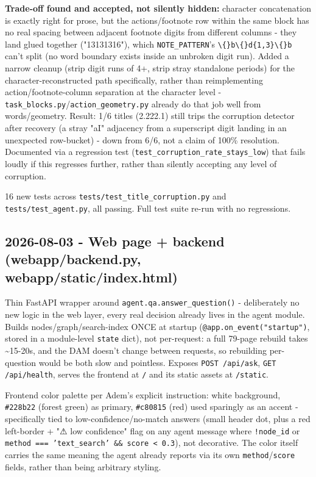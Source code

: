 \textbf{Trade-off found and accepted, not silently hidden:} character concatenation is exactly right for prose, but the actions/footnote row within the same block has no real spacing between adjacent footnote digits from different columns - they land glued together ("13131316"), which \texttt{NOTE\_\allowbreak{}PATTERN}'s \texttt{\textbackslash\{\}b\textbackslash\{\}d\{1,3\}\textbackslash\{\}b} can't split (no word boundary exists inside an unbroken digit run). Added a narrow cleanup (strip digit runs of 4+, strip stray standalone periods) for the character-reconstructed path specifically, rather than reimplementing action/footnote-column separation at the character level - \texttt{task\_\allowbreak{}blocks.py}/\texttt{action\_\allowbreak{}geometry.py} already do that job well from words/geometry. Result: 1/6 titles (2.222.1) still trips the corruption detector after recovery (a stray "aI" adjacency from a superscript digit landing in an unexpected row-bucket) - down from 6/6, not a claim of 100\% resolution. Documented via a regression test (\texttt{test\_\allowbreak{}corruption\_\allowbreak{}rate\_\allowbreak{}stays\_\allowbreak{}low}) that fails loudly if this regresses further, rather than silently accepting any level of corruption.

16 new tests across \texttt{tests/\allowbreak{}test\_\allowbreak{}title\_\allowbreak{}corruption.py} and \texttt{tests/\allowbreak{}test\_\allowbreak{}agent.py}, all passing. Full test suite re-run with no regressions.

\subsection*{2026-08-03 - Web page + backend (webapp/backend.py, webapp/static/index.html)}
Thin FastAPI wrapper around \texttt{agent.qa.answer\_\allowbreak{}question()} - deliberately no new logic in the web layer, every real decision already lives in the agent module. Builds nodes/graph/search-index ONCE at startup (\texttt{@app.on\_\allowbreak{}event("startup")}, stored in a module-level \texttt{state} dict), not per-request: a full 79-page rebuild takes \textasciitilde{}15-20s, and the DAM doesn't change between requests, so rebuilding per-question would be both slow and pointless. Exposes \texttt{POST /\allowbreak{}api/\allowbreak{}ask}, \texttt{GET /\allowbreak{}api/\allowbreak{}health}, serves the frontend at \texttt{/\allowbreak{}} and its static assets at \texttt{/\allowbreak{}static}.

Frontend color palette per Adem's explicit instruction: white background, \texttt{\#228b22} (forest green) as primary, \texttt{\#c80815} (red) used sparingly as an accent - specifically tied to low-confidence/no-match answers (small header dot, plus a red left-border + "⚠ low confidence" flag on any agent message where \texttt{!node\_\allowbreak{}id} or \texttt{method === 'text\_\allowbreak{}search' \&\& score < 0.3}), not decorative. The color itself carries the same meaning the agent already reports via its own \texttt{method}/\texttt{score} fields, rather than being arbitrary styling.

